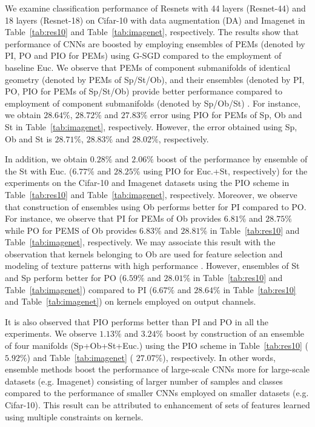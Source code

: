 \documentclass[10pt,journal,compsoc]{IEEEtran}
\theoremstyle{definition}
\theoremstyle{definition}
\theoremstyle{remark}
\theoremstyle{remark}
\theoremstyle{remark}
\begin{document}
We examine classification performance of Resnets with 44 layers (Resnet-44) and 18 layers (Resnet-18) on Cifar-10  with data augmentation (DA) and Imagenet in Table~\ref{tab:res10} and Table~\ref{tab:imagenet}, respectively. The results show that performance of CNNs are boosted by employing ensembles of PEMs (denoted by PI, PO and PIO for PEMs) using G-SGD compared to the employment of baseline Euc. We observe that PEMs of component submanifolds of identical geometry (denoted by PEMs of Sp/St/Ob), and their ensembles (denoted by PI, PO, PIO for PEMs of Sp/St/Ob)  provide better performance compared to employment of component submanifolds (denoted by Sp/Ob/St) \cite{oo16}. For instance, we obtain $28.64\%$, $28.72\%$ and $27.83\%$ error using PIO for PEMs of Sp, Ob and St in Table~\ref{tab:imagenet}, respectively. However, the error obtained using Sp, Ob and St is $28.71\%$, $28.83\%$ and $28.02\%$, respectively.


In addition, we obtain $0.28\%$ and $2.06\%$ boost of the performance by ensemble of the St with Euc. ($6.77\%$ and $28.25\%$ using PIO for Euc.+St, respectively) for the experiments on the Cifar-10 and Imagenet datasets using the  PIO scheme in Table~\ref{tab:res10} and Table~\ref{tab:imagenet}, respectively. Moreover, we observe that construction of ensembles using Ob performs better for PI compared to PO. For instance, we observe that PI for PEMs of Ob provides $6.81\%$ and $28.75\%$ while PO for PEMS of Ob provides $6.83\%$ and $28.81\%$ in Table~\ref{tab:res10} and Table~\ref{tab:imagenet}, respectively.   We may associate this result with the observation that kernels belonging to Ob are used for feature selection and modeling of texture patterns with high performance \cite{oblq,oo16}. However, ensembles of St and Sp perform better for PO ($6.59\%$ and $28.01\%$ in Table~\ref{tab:res10} and Table~\ref{tab:imagenet}) compared to PI ($6.67\%$ and $28.64\%$ in Table~\ref{tab:res10} and Table~\ref{tab:imagenet}) on kernels employed on output channels. 

It is also observed that  PIO performs better than PI and PO in all the experiments. We observe {\color{blue} $1.13\%$} and {\color{blue} $3.24\%$} boost by construction of an ensemble of four manifolds (Sp+Ob+St+Euc.) using the  PIO scheme in Table~\ref{tab:res10}  ({\color{blue} $5.92\%$}) and Table~\ref{tab:imagenet} ({\color{blue} $27.07\%$}), respectively. In other words, ensemble methods boost the performance of large-scale CNNs more for large-scale datasets (e.g. Imagenet) consisting of larger number of samples and classes compared to the performance of smaller CNNs employed on smaller datasets (e.g. Cifar-10). This result can be attributed to enhancement of sets of features learned using multiple constraints on kernels.
\end{document}
